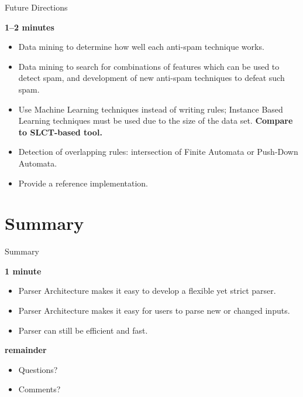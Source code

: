 \documentclass{beamer}
\newcommand{\timingnote}[1]{%
    \textbf{#1}%
}
\begin{document}
\begin{frame}{Future Directions}

    \timingnote{1--2 minutes}

    \begin{itemize}

        \item Data mining to determine how well each anti-spam technique
            works.

        \item Data mining to search for combinations of features which can
            be used to detect spam, and development of new anti-spam
            techniques to defeat such spam.

        \item Use Machine Learning techniques instead of writing rules;
            Instance Based Learning techniques must be used due to the size
            of the data set.  \timingnote{Compare to SLCT-based tool.}

        \item Detection of overlapping rules: intersection of Finite
            Automata or Push-Down Automata.

        \item Provide a reference implementation.

    \end{itemize}

\end{frame}


\section{Summary}

\begin{frame}{Summary}

    \timingnote{1 minute}

    \begin{itemize}

        \item Parser Architecture makes it easy to develop a flexible yet
            strict parser.

        \item Parser Architecture makes it easy for users to parse new or
            changed inputs.

        \item Parser can still be efficient and fast.

    \end{itemize}

    \timingnote{remainder}

    \begin{itemize}

        \item Questions?

        \item Comments?

    \end{itemize}

\end{frame}
\end{document}
